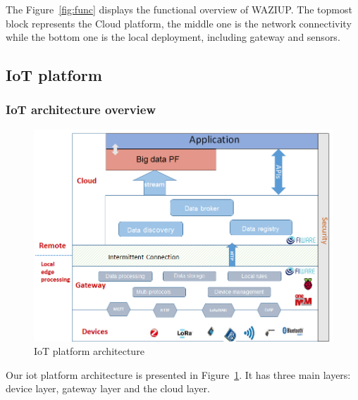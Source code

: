 The Figure~\ref{fig:func} displays the functional overview of WAZIUP.
The topmost block represents the Cloud platform, the middle one is the network connectivity while the bottom one is the local deployment, including gateway and sensors.

\subsection{IoT platform}

\subsubsection{IoT architecture overview}


\begin{figure}[h]
\centering
\includegraphics[width=\textwidth]{figs/iotarchi.png}
\caption{IoT platform architecture}
\label{fig:iotarchi}
\end{figure}

Our iot platform architecture is presented in Figure~\ref{fig:iotarchi}.
It has three main layers: device layer, gateway layer and the cloud layer.

